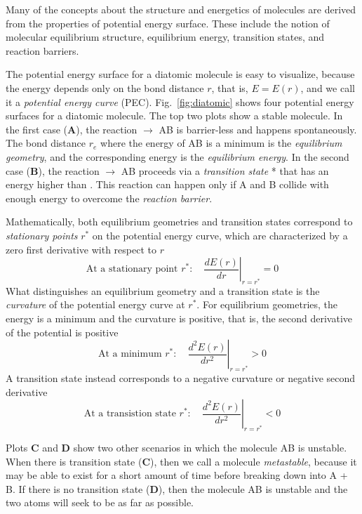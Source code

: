 \documentclass[../Main/chem371-notes.tex]{subfiles}
\begin{document}
Many of the concepts about the structure and energetics of molecules are derived from the properties of potential energy surface.
These include the notion of molecular equilibrium structure, equilibrium energy, transition states, and reaction barriers.

The potential energy surface for a diatomic molecule  is easy to visualize, because the energy depends only on the bond distance $r$, that is, $E = E(r)$, and we call it a \emph{potential energy curve} (PEC).
Fig.~\ref{fig:diatomic} shows four potential energy surfaces for a diatomic molecule.
The top two plots show a stable  molecule.
In the first case (\textbf{A}), the reaction  $\rightarrow$ {AB} is barrier-less and happens spontaneously.
The bond distance $r_e$ where the energy of AB is a minimum is the \emph{equilibrium geometry}, and the corresponding energy is the \emph{equilibrium energy}.
In the second case  (\textbf{B}),  the reaction  $\rightarrow$ {AB} proceeds via a \emph{transition state} * that has an energy higher than .
This reaction can happen only if A and B collide with enough energy to overcome the \emph{reaction barrier}.

Mathematically, both equilibrium geometries and transition states correspond to \emph{stationary points} $r^*$ on the potential energy curve, which are characterized by a zero first derivative with respect to $r$
\begin{equation}
\text{At a stationary point } r^*: \quad \left.\frac{d E(r)}{dr}\right|_{r = r^*} = 0
\end{equation}
What distinguishes an equilibrium geometry and a transition state is the \emph{curvature} of the potential energy curve at $r^*$.
For equilibrium geometries, the energy is a minimum and the curvature is positive, that is, the second derivative of the potential is positive
\begin{equation}
\text{At a minimum } r^*: \quad \left.\frac{d^2 E(r)}{dr^2}\right|_{r = r^*} > 0
\end{equation}
A transition state instead corresponds to a negative curvature or negative second derivative
\begin{equation}
\text{At a transistion state } r^*: \quad \left.\frac{d^2 E(r)}{dr^2}\right|_{r = r^*} < 0
\end{equation}

Plots \textbf{C} and \textbf{D} show two other scenarios in which the molecule AB is unstable.
When there is transition state (\textbf{C}), then we call a molecule \emph{metastable}, because it may be able to exist for a short amount of time before breaking down into A + B.
If there is no transition state (\textbf{D}), then the molecule AB is unstable and the two atoms will seek to be as far as possible.
\end{document}
